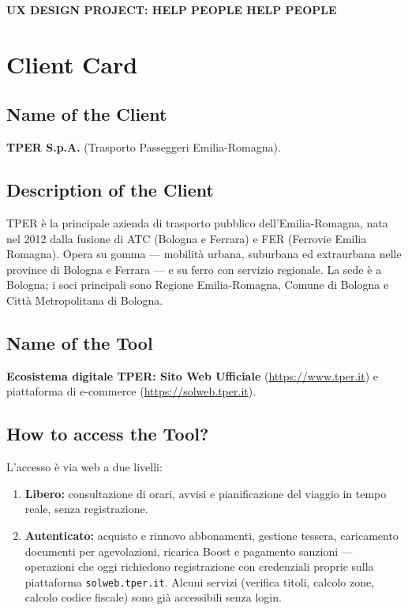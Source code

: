\documentclass[11pt,a4paper]{article}
\begin{document}
\begin{tcolorbox}[colback=primaryColor,colframe=primaryColor,arc=3mm,halign=center,valign=center,height=2.5cm]
    \color{white}\LARGE\bfseries UX DESIGN PROJECT: HELP PEOPLE HELP PEOPLE \\[0.2cm]
\end{tcolorbox}

\vspace{0.5cm}

\section{Client Card}

\subsection{Name of the Client}
\textbf{TPER S.p.A.} (Trasporto Passeggeri Emilia-Romagna).

\subsection{Description of the Client}
TPER è la principale azienda di trasporto pubblico dell'Emilia-Romagna,
nata nel 2012 dalla fusione di ATC (Bologna e Ferrara) e FER (Ferrovie
Emilia Romagna). Opera su gomma --- mobilità urbana, suburbana ed extraurbana
nelle province di Bologna e Ferrara --- e su ferro con servizio regionale.
La sede è a Bologna; i soci principali sono Regione Emilia-Romagna, Comune
di Bologna e Città Metropolitana di Bologna.

\subsection{Name of the Tool}
\textbf{Ecosistema digitale TPER: Sito Web Ufficiale}
(\url{https://www.tper.it}) e piattaforma di e-commerce
(\url{https://solweb.tper.it}).

\subsection{How to access the Tool?}
L'accesso è via web a due livelli:
\begin{enumerate}[leftmargin=*]
    \item \textbf{Libero:} consultazione di orari, avvisi e pianificazione
    del viaggio in tempo reale, senza registrazione.
    \item \textbf{Autenticato:} acquisto e rinnovo abbonamenti, gestione
    tessera, caricamento documenti per agevolazioni, ricarica Boost e
    pagamento sanzioni --- operazioni che oggi richiedono registrazione
    con credenziali proprie sulla piattaforma \texttt{solweb.tper.it}.
    Alcuni servizi (verifica titoli, calcolo zone, calcolo codice
    fiscale) sono già accessibili senza login.
\end{enumerate}
\end{document}
